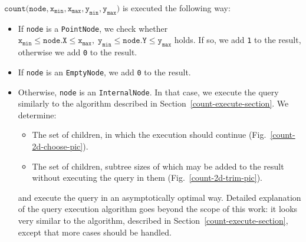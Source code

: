 \documentclass[times, dvipsnames,%
               languages={russian,english} %
              ]{itmo-student-thesis}
\begin{document}
$\texttt{count(node}, \texttt{x}_{\texttt{min}}, \texttt{x}_{\texttt{max}}, \texttt{y}_{\texttt{min}}, \texttt{y}_{\texttt{max}}\texttt{)}$ is executed the following way:

\begin{itemize}
    \item If \texttt{node} is a \texttt{PointNode}, we check whether $\texttt{x}_{\texttt{min}} \leq \texttt{node.X} \leq \texttt{x}_{\texttt{max}}, \; \texttt{y}_{\texttt{min}} \leq \texttt{node.Y} \leq \texttt{y}_{\texttt{max}}$ holds. If so, we add \texttt{1} to the result, otherwise we add \texttt{0} to the result.
    
    \item If \texttt{node} is an \texttt{EmptyNode}, we add \texttt{0} to the result.
    
    \item Otherwise, \texttt{node} is an \texttt{InternalNode}. In that case, we execute the query similarly to the algorithm described in Section~\ref{count-execute-section}. We determine:
    
    \begin{itemize}
        \item The set of children, in which the execution should continue (Fig.~\ref{count-2d-choose-pic}).
        
        \item The set of children, subtree sizes of which may be added to the result without executing the query in them (Fig.~\ref{count-2d-trim-pic}).
    \end{itemize}
    
    \bigbreak
    
    and execute the query in an asymptotically optimal way. Detailed explanation of the query execution algorithm goes beyond the scope of this work: it looks very similar to the algorithm, described in Section~\ref{count-execute-section}, except that more cases should be handled.
\end{itemize}
\end{document}
